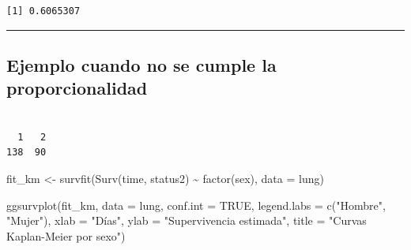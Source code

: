 \documentclass[
]{article}
\newenvironment{Shaded}{\begin{snugshade}}{\end{snugshade}}
\newcommand{\AttributeTok}[1]{\textcolor[rgb]{0.40,0.45,0.13}{#1}}
\newcommand{\CommentTok}[1]{\textcolor[rgb]{0.37,0.37,0.37}{#1}}
\newcommand{\ConstantTok}[1]{\textcolor[rgb]{0.56,0.35,0.01}{#1}}
\newcommand{\DecValTok}[1]{\textcolor[rgb]{0.68,0.00,0.00}{#1}}
\newcommand{\FunctionTok}[1]{\textcolor[rgb]{0.28,0.35,0.67}{#1}}
\newcommand{\NormalTok}[1]{\textcolor[rgb]{0.00,0.23,0.31}{#1}}
\newcommand{\OtherTok}[1]{\textcolor[rgb]{0.00,0.23,0.31}{#1}}
\newcommand{\SpecialCharTok}[1]{\textcolor[rgb]{0.37,0.37,0.37}{#1}}
\newcommand{\StringTok}[1]{\textcolor[rgb]{0.13,0.47,0.30}{#1}}
\begin{document}
\begin{verbatim}
[1] 0.6065307
\end{verbatim}

\begin{center}\rule{0.5\linewidth}{0.5pt}\end{center}

\subsection{Ejemplo cuando no se cumple la
proporcionalidad}\label{ejemplo-cuando-no-se-cumple-la-proporcionalidad}

\begin{Shaded}
\end{Shaded}

\begin{verbatim}

  1   2 
138  90 
\end{verbatim}

\begin{Shaded}
\begin{Highlighting}[]
\NormalTok{fit\_km }\OtherTok{\textless{}{-}} \FunctionTok{survfit}\NormalTok{(}\FunctionTok{Surv}\NormalTok{(time, status2) }\SpecialCharTok{\textasciitilde{}} \FunctionTok{factor}\NormalTok{(sex), }\AttributeTok{data =}\NormalTok{ lung)}

\FunctionTok{ggsurvplot}\NormalTok{(fit\_km,}
           \AttributeTok{data =}\NormalTok{ lung,}
           \AttributeTok{conf.int =} \ConstantTok{TRUE}\NormalTok{,}
           \AttributeTok{legend.labs =} \FunctionTok{c}\NormalTok{(}\StringTok{"Hombre"}\NormalTok{, }\StringTok{"Mujer"}\NormalTok{),}
           \AttributeTok{xlab =} \StringTok{"Días"}\NormalTok{, }\AttributeTok{ylab =} \StringTok{"Supervivencia estimada"}\NormalTok{,}
           \AttributeTok{title =} \StringTok{"Curvas Kaplan{-}Meier por sexo"}\NormalTok{)}
\end{Highlighting}
\end{Shaded}
\end{document}
